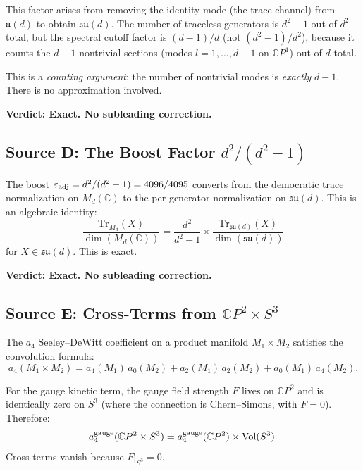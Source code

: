 \documentclass[12pt,a4paper]{article}
\theoremstyle{definition}
\theoremstyle{remark}
\newcommand{\CP}{\mathbb{C}P}
\newcommand{\Tr}{\mathrm{Tr}}
\begin{document}
This factor arises from removing the identity mode (the trace channel) from
$\mathfrak{u}(d)$ to obtain $\mathfrak{su}(d)$. The number of traceless
generators is $d^2 - 1$ out of $d^2$ total, but the spectral cutoff factor
is $(d-1)/d$ (not $(d^2-1)/d^2$), because it counts the $d - 1$ nontrivial
sections (modes $l = 1, \ldots, d-1$ on $\CP^1$) out of $d$ total.

This is a \emph{counting argument}: the number of nontrivial modes is
\emph{exactly} $d - 1$. There is no approximation involved.

\textbf{Verdict: Exact. No subleading correction.}

\subsection{Source D: The Boost Factor $d^2/(d^2 - 1)$}
\label{sec:sourceD}

The boost $\varepsilon_{\rm adj} = d^2/(d^2 - 1) = 4096/4095$ converts from
the democratic trace normalization on $M_d(\mathbb{C})$ to the per-generator
normalization on $\mathfrak{su}(d)$. This is an algebraic identity:
\begin{equation}
\frac{\Tr_{M_d}(X)}{\dim(M_d(\mathbb{C}))}
= \frac{d^2}{d^2 - 1} \times
\frac{\Tr_{\mathfrak{su}(d)}(X)}{\dim(\mathfrak{su}(d))}
\end{equation}
for $X \in \mathfrak{su}(d)$. This is exact.

\textbf{Verdict: Exact. No subleading correction.}

\subsection{Source E: Cross-Terms from $\CP^2 \times S^3$}
\label{sec:sourceE}

The $a_4$ Seeley--DeWitt coefficient on a product manifold $M_1 \times M_2$
satisfies the convolution formula:
\begin{equation}
a_4(M_1 \times M_2) = a_4(M_1)\,a_0(M_2) + a_2(M_1)\,a_2(M_2)
+ a_0(M_1)\,a_4(M_2).
\end{equation}

For the gauge kinetic term, the gauge field strength $F$ lives on $\CP^2$
and is identically zero on $S^3$ (where the connection is Chern--Simons,
with $F = 0$). Therefore:
\begin{equation}
a_4^{\rm gauge}(\CP^2 \times S^3)
= a_4^{\rm gauge}(\CP^2) \times \mathrm{Vol}(S^3).
\end{equation}
Cross-terms vanish because $F|_{S^3} = 0$.
\end{document}
